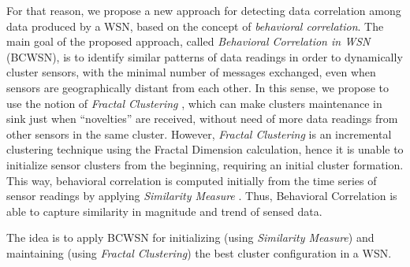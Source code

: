 \documentclass{acm_proc_article-sp}
\begin{document}
For that reason, we propose a new approach for detecting data correlation among
data produced by a WSN, based on the concept of {\it behavioral correlation}.
The main goal of the proposed approach, called  {\it Behavioral Correlation in
WSN} (BCWSN), is to identify similar patterns of data readings in order to
dynamically cluster sensors, with the minimal number of messages exchanged, even
when sensors are geographically distant from each other. In this sense, we
propose to use the notion of {\it Fractal Clustering} \cite{Barbara2000}, which
can make clusters maintenance in sink just when ``novelties'' are received,
without need of more data readings from other sensors in the same cluster.
However, {\it Fractal Clustering} is an incremental clustering technique using
the Fractal Dimension calculation, hence it is unable to initialize sensor
clusters from the beginning, requiring an initial cluster formation. This way,
behavioral correlation is computed initially from the time series of sensor
readings by applying {\it Similarity Measure} \cite{Liu2007}.
Thus, Behavioral Correlation is able to capture similarity in magnitude and
trend of sensed data.
\vspace*{-.3cm}


The idea is to apply BCWSN for initializing (using {\it Similarity Measure}) and
maintaining (using {\it Fractal Clustering}) the best cluster configuration in a
WSN.
\vspace*{-.3cm}

\end{document}
